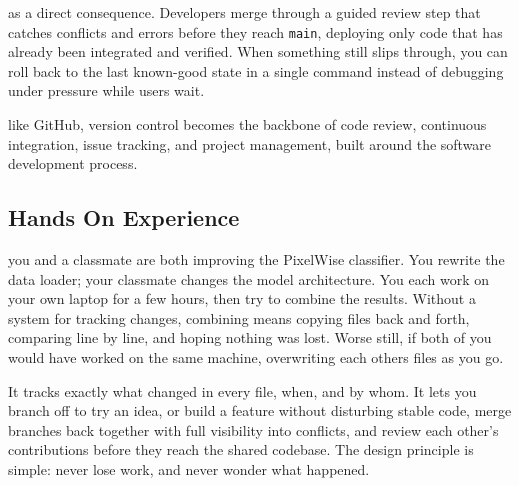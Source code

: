  as a direct consequence.
Developers merge through a guided review step that catches conflicts and errors
before they reach \texttt{main}, deploying only code that has already been integrated and verified.
When something still slips through, you can roll back to the last known-good state in a single command
instead of debugging under pressure while users wait.

 like GitHub,
version control becomes the backbone of code review,
continuous integration, issue tracking, and project management, built around 
the software development process.




\subsection{Hands On Experience}

 you and a classmate are both improving the PixelWise classifier.
You rewrite the data loader; your classmate changes the model architecture.
You each work on your own laptop for a few hours, then try to combine the results.
Without a system for tracking changes, combining means copying files back and forth,
comparing line by line, and hoping nothing was lost. Worse still, if both of
you would have worked on the same machine, overwriting each others files as you go.


 It tracks exactly what changed in every file, 
when, and by whom.
It lets you branch off to try an idea, or build a feature without disturbing stable code,
merge branches back together with full visibility into conflicts,
and review each other's contributions before they reach the shared codebase.
The design principle is simple: never lose work, and never wonder what happened.


